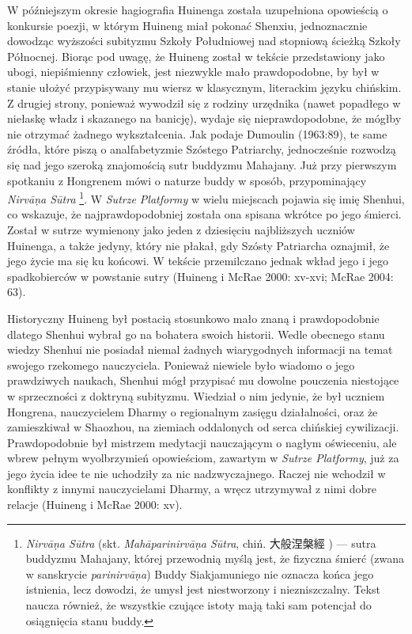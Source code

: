 W późniejszym okresie hagiografia Huinenga została uzupełniona opowieścią o konkursie poezji, w którym Huineng miał pokonać Shenxiu, jednoznacznie dowodząc wyższości subityzmu Szkoły Południowej nad stopniową ścieżką Szkoły Północnej.
Biorąc pod uwagę, że Huineng został w tekście przedstawiony jako ubogi, niepiśmienny człowiek, jest niezwykle mało prawdopodobne, by był w stanie ułożyć przypisywany mu wiersz w klasycznym, literackim języku chińskim.
Z drugiej strony, ponieważ wywodził się z rodziny urzędnika (nawet popadłego w niełaskę władz i skazanego na banicję), wydaje się nieprawdopodobne, że mógłby nie otrzymać żadnego wykształcenia.
Jak podaje Dumoulin (1963:89), te same źródła, które piszą o analfabetyzmie Szóstego Patriarchy, jednocześnie rozwodzą się nad jego szeroką znajomością sutr buddyzmu Mahajany.
Już przy pierwszym spotkaniu z Hongrenem mówi o naturze buddy w sposób, przypominający \textit{Nirvā\d{n}a Sūtra}%
\footnote{\textit{Nirvā\d{n}a Sūtra} (skt. \textit{Mahāparinirvā\d{n}a Sūtra}, chiń. 大般涅槃經 ) --- sutra buddyzmu Mahajany, której przewodnią myślą jest, że fizyczna śmierć (zwana w sanskrycie \textit{parinirvā\d{n}a}) Buddy Siakjamuniego nie oznacza końca jego istnienia, lecz dowodzi, że umysł %
jest niestworzony i niezniszczalny. Tekst naucza również, że wszystkie czujące istoty mają taki sam potencjał do osiągnięcia stanu buddy.}.
W \textit{Sutrze Platformy} w wielu miejscach pojawia się imię Shenhui, co wskazuje, że najprawdopodobniej została ona spisana wkrótce po jego śmierci.
Został w sutrze wymienony jako jeden z dziesięciu najbliższych uczniów Huinenga, a także jedyny, który nie płakał, gdy Szósty Patriarcha oznajmił, że jego życie ma się ku końcowi.
W tekście przemilczano jednak wkład jego i jego spadkobierców w powstanie sutry
(Huineng i McRae 2000: xv-xvi; McRae 2004: 63).

Historyczny Huineng był postacią stosunkowo mało znaną i prawdopodobnie dlatego Shenhui wybrał go na bohatera swoich historii.
Wedle obecnego stanu wiedzy Shenhui nie posiadał niemal żadnych wiarygodnych informacji na temat swojego rzekomego nauczyciela.
Ponieważ niewiele było wiadomo o jego prawdziwych naukach, Shenhui mógł przypisać mu dowolne pouczenia niestojące w sprzeczności z doktryną subityzmu.
Wiedział o nim jedynie, że był uczniem Hongrena, nauczycielem Dharmy o regionalnym zasięgu działalności, oraz że zamieszkiwał w Shaozhou, na ziemiach oddalonych od serca chińskiej cywilizacji.
Prawdopodobnie był mistrzem medytacji nauczającym o nagłym oświeceniu, ale wbrew pełnym wyolbrzymień opowieściom, zawartym w \textit{Sutrze Platformy}, już za jego życia idee te nie uchodziły za nic nadzwyczajnego.
Raczej nie wchodził w konflikty z innymi nauczycielami Dharmy, a wręcz utrzymywał z nimi dobre relacje
(Huineng i McRae 2000: xv).

